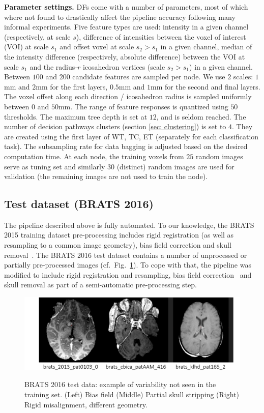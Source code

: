 \noindent
\textbf{Parameter settings.} DFs come with a number of parameters, most of which where not found to drastically affect the pipeline accuracy following many informal experiments. Five feature types are used: intensity in a given channel (respectively, at scale $s$), difference of intensities between the voxel of interest (VOI) at scale $s_1$ and offset voxel at scale $s_2 > s_1$ in a given channel, median of the intensity difference (respectively, absolute difference) between the VOI at scale $s_1$ and the radius-$r$ icosahedron vertices (scale $s_2>s_1$) in a given channel. Between $100$ and $200$ candidate features are sampled per node. We use $2$ scales: $1$mm and $2$mm for the first layers, $0.5$mm and $1$mm for the second and final layers. The voxel offset along each direction / icosahedron radius is sampled uniformly between $0$ and $50$mm. The range of feature responses is quantized using $50$ thresholds. The maximum tree depth is set at $12$, and is seldom reached. The number of decision pathways clusters (section \ref{sec: clustering}) is set to $4$. They are created using the first layer of WT, TC, ET (separately for each classification task). The subsampling rate for data bagging is adjusted based on the desired computation time. At each node, the training voxels from $25$ random images serve as tuning set and similarly $30$ (distinct) random images are used for validation (the remaining images are not used to train the node).

\subsection{Test dataset (BRATS 2016)}

The pipeline described above is fully automated. To our knowledge, the BRATS 2015 training dataset pre-processing includes rigid registration (as well as resampling to a common image geometry), bias field correction and skull removal~\cite{menze2015multimodal}. The BRATS 2016 test dataset contains a number of unprocessed or partially pre-processed images (cf.~Fig.~\ref{fig: test data}). To cope with that, the pipeline was modified to include rigid registration and resampling, bias field correction~\cite{tustison2009n4itk} and skull removal as part of a semi-automatic pre-processing step.

\begin{figure}
\centering
\includegraphics[width=1\textwidth]{images/BRATS2016_example-data.png}
\label{fig: test data}
\caption{BRATS 2016 test data: example of variability not seen in the training set. (Left) Bias field (Middle) Partial skull stripping (Right) Rigid misalignment, different geometry.}
\end{figure}

